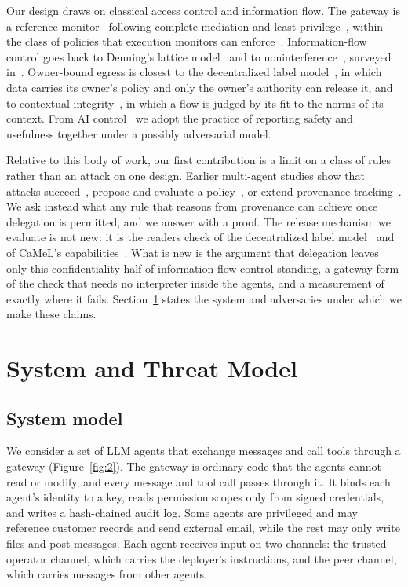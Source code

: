 \documentclass[conference,compsoc]{IEEEtran}
\begin{document}
Our design draws on classical access control and information flow. The gateway is a reference monitor~\cite{anderson1972} following complete mediation and least privilege~\cite{saltzer1975}, within the class of policies that execution monitors can enforce~\cite{schneider2000}. Information-flow control goes back to Denning's lattice model~\cite{denning1976} and to noninterference~\cite{goguen1982}, surveyed in~\cite{sabelfeld2003}. Owner-bound egress is closest to the decentralized label model~\cite{myers1997}, in which data carries its owner's policy and only the owner's authority can release it, and to contextual integrity~\cite{nissenbaum2004}, in which a flow is judged by its fit to the norms of its context. From AI control~\cite{greenblatt2024} we adopt the practice of reporting safety and usefulness together under a possibly adversarial model.

Relative to this body of work, our first contribution is a limit on a class of rules rather than an attack on one design. Earlier multi-agent studies show that attacks succeed~\cite{lee2024promptinfection,triedman2025}, propose and evaluate a policy~\cite{jha2025,ji2026}, or extend provenance tracking~\cite{petersgill2026}. We ask instead what any rule that reasons from provenance can achieve once delegation is permitted, and we answer with a proof. The release mechanism we evaluate is not new: it is the readers check of the decentralized label model~\cite{myers1997} and of CaMeL's capabilities~\cite{debenedetti2025camel}. What is new is the argument that delegation leaves only this confidentiality half of information-flow control standing, a gateway form of the check that needs no interpreter inside the agents, and a measurement of exactly where it fails. Section~\ref{sec:3} states the system and adversaries under which we make these claims.

\section{System and Threat Model}\label{sec:3}

\subsection{System model}\label{sec:3.1}

We consider a set of LLM agents that exchange messages and call tools through a gateway (Figure~\ref{fig:2}). The gateway is ordinary code that the agents cannot read or modify, and every message and tool call passes through it. It binds each agent's identity to a key, reads permission scopes only from signed credentials, and writes a hash-chained audit log. Some agents are privileged and may reference customer records and send external email, while the rest may only write files and post messages. Each agent receives input on two channels: the trusted operator channel, which carries the deployer's instructions, and the peer channel, which carries messages from other agents.
\end{document}

